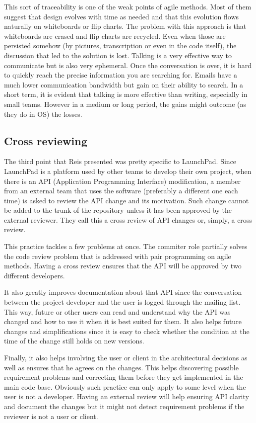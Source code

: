This sort of traceability is one of the weak points of agile
methods. Most of them suggest that design evolves with time as needed
and that this evolution flows naturally on whiteboards or flip
charts. The problem with this approach is that whiteboards are erased
and flip charts are recycled. Even when those are persisted somehow
(by pictures, transcription or even in the code itself), the
discussion that led to the solution is lost. Talking is a very
effective way to communicate but is also very ephemeral. Once the
conversation is over, it is hard to quickly reach the precise
information you are searching for. Emails have a much lower
communication bandwidth but gain on their ability to search. In a
short term, it is evident that talking is more effective than writing,
especially in small teams. However in a medium or long period, the
gains might outcome (as they do in OS) the losses.

\subsection{Cross reviewing}
\label{subsec:crossrev}

The third point that Reis presented was pretty specific to
LaunchPad. Since LaunchPad is a platform used by other teams to
develop their own project, when there is an API (Application
Programming Interface) modification, a member from an external team
that uses the software (preferably a different one each time) is asked
to review the API change and its motivation. Such change cannot be
added to the trunk of the repository unless it has been approved by
the external reviewer. They call this a cross review of API changes
or, simply, a cross review.

This practice tackles a few problems at once. The commiter role
partially solves the code review problem that is addressed with pair
programming on agile methods. Having a cross review ensures that the
API will be approved by two different developers.

It also greatly improves documentation about that API since the
conversation between the project developer and the user is logged
through the mailing list. This way, future or other users can read and
understand why the API was changed and how to use it when it is best
suited for them. It also helps future changes and simplifications
since it is easy to check whether the condition at the time of the
change still holds on new versions.

Finally, it also helps involving the user or client in the
architectural decisions as well as ensures that he agrees on the
changes. This helps discovering possible requirement problems and
correcting them before they get implemented in the main code
base. Obviously such practice can only apply to some level when the
user is not a developer. Having an external review will help ensuring
API clarity and document the changes but it might not detect
requirement problems if the reviewer is not a user or client.

